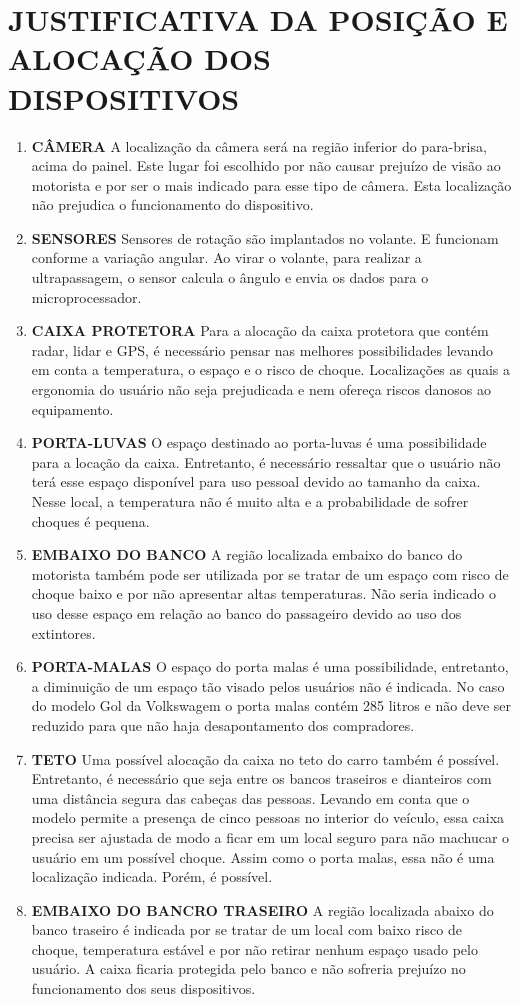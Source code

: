 \chapter[JUSTIFICATIVA DA POSIÇÃO E ALOCAÇÃO DOS DISPOSITIVOS]{JUSTIFICATIVA DA POSIÇÃO E ALOCAÇÃO DOS DISPOSITIVOS}
\begin{enumerate}
\item \textbf{CÂMERA}
A localização da câmera será na região inferior do para-brisa, acima do painel. Este lugar foi escolhido por não causar prejuízo de visão ao motorista e por ser o mais indicado para esse tipo de câmera. Esta localização não prejudica o funcionamento do dispositivo.
\item \textbf{SENSORES}
Sensores de rotação são implantados no volante. E funcionam conforme a variação angular. Ao virar o volante, para realizar a ultrapassagem, o sensor calcula o ângulo e envia os dados para o microprocessador.
\item \textbf{CAIXA PROTETORA}
Para a alocação da caixa protetora que contém radar, lidar e GPS, é necessário pensar nas melhores possibilidades levando em conta a temperatura, o espaço e o risco de choque. Localizações as quais a ergonomia do usuário não seja prejudicada e nem ofereça riscos danosos ao equipamento.
\item \textbf{PORTA-LUVAS}
O espaço destinado ao porta-luvas é uma possibilidade para a locação da caixa. Entretanto, é necessário ressaltar que o usuário não terá esse espaço disponível para uso pessoal devido ao tamanho da caixa. Nesse local, a temperatura não é muito alta e a probabilidade de sofrer choques é pequena.
\item \textbf{EMBAIXO DO BANCO}
A região localizada embaixo do banco do motorista também pode ser utilizada por se tratar de um espaço com risco de choque baixo e por não apresentar altas temperaturas. Não seria indicado o uso desse espaço em relação ao banco do passageiro devido ao uso dos extintores.
\item \textbf{PORTA-MALAS}
O espaço do porta malas é uma possibilidade, entretanto, a diminuição de um espaço tão visado pelos usuários não é indicada. No caso do modelo Gol da Volkswagem o porta malas contém 285 litros e não deve ser reduzido para que não haja desapontamento dos compradores.
\item \textbf{TETO}
Uma possível alocação da caixa no teto do carro também é possível. Entretanto, é necessário que seja entre os bancos traseiros e dianteiros com uma distância segura das cabeças das pessoas. Levando em conta que o modelo permite a presença de cinco pessoas no interior do veículo, essa caixa precisa ser ajustada de modo a ficar em um local seguro para não machucar o usuário em um possível choque. Assim como o porta malas, essa não é uma localização indicada. Porém, é possível.
\item \textbf{EMBAIXO DO BANCRO TRASEIRO}
A região localizada abaixo do banco traseiro é indicada por se tratar de um local com baixo risco de choque, temperatura estável e por não retirar nenhum espaço usado pelo usuário. A caixa ficaria protegida pelo banco e não sofreria prejuízo no funcionamento dos seus dispositivos.
\end{enumerate}
